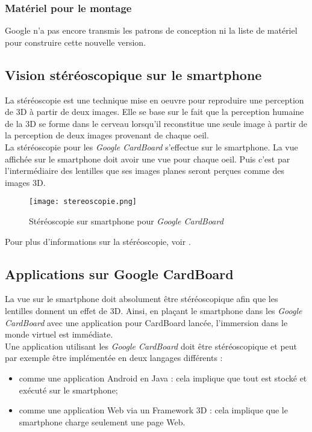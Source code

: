 \subsubsection{Matériel pour le montage}
Google n'a pas encore transmis les patrons de conception ni la liste de matériel pour construire cette nouvelle version.

\pagebreak
\subsection*{Vision stéréoscopique sur le smartphone} \label{vision}
La stéréoscopie est une technique mise en oeuvre pour reproduire une perception de 3D à partir de deux images. Elle se base sur le fait que la perception humaine de la 3D se forme dans le cerveau lorsqu'il reconstitue une seule image à partir de la perception de deux images provenant de chaque oeil. \\

La stéréoscopie pour les \textit{Google CardBoard} s'effectue sur le \textsf{smartphone}. La vue affichée sur le \textsf{smartphone} doit avoir une vue pour chaque oeil. Puis c'est par l'intermédiaire des lentilles que ses images planes seront perçues comme des images 3D.

\begin{figure}[H]
\centering 
\texttt{[image: stereoscopie.png]}
\caption{\label{sterescopie} Stéréoscopie sur smartphone pour \textit{Google CardBoard}}
\end{figure}

Pour plus d'informations sur la stéréoscopie, voir \cite{stereoscopie}.

\subsection*{Applications sur Google CardBoard}  \label{applications}
La vue sur le \textsf{smartphone} doit absolument être stéréoscopique afin que les lentilles donnent un effet de 3D. Ainsi, en plaçant le \textsf{smartphone} dans les \textit{Google CardBoard} avec une application pour \textsf{CardBoard} lancée, l'immersion dans le monde virtuel est immédiate. \\

Une application utilisant les \textit{Google CardBoard} doit être stéréoscopique et peut par exemple être implémentée en deux langages différents : 
\begin{itemize}
\item comme une application \textsf{Android} en Java : cela implique que tout est stocké et exécuté sur le \textsf{smartphone};
\item comme une application Web via un Framework 3D : cela implique que le \textsf{smartphone} charge seulement une page Web.
\end{itemize}

